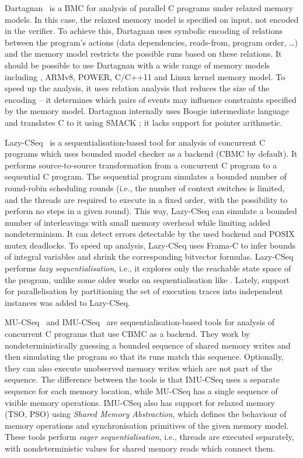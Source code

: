 Dartagnan~ is a BMC for analysis of parallel C programs under relaxed memory models.
In this case, the relaxed memory model is specified on input, not encoded in the verifier.
To achieve this, Dartagnan uses symbolic encoding of relations between the program's actions (data dependencies, reads-from, program order, …) and the memory model restricts the possible runs based on these relations.
It should be possible to use Dartagnan with a wide range of memory models including \xtso, ARMv8, POWER, C/C++11 and Linux kernel memory model.
To speed up the analysis, it uses relation analysis that reduces the size of the encoding -- it determines which pairs of events may influence constraints specified by the memory model.
Dartagnan internally uses Boogie intermediate language and translates C to it using SMACK ; it lacks support for pointer arithmetic.

Lazy-CSeq~ is a se\-quen\-tial\-isa\-tion-based
tool for analysis of concurrent C programs which uses bounded model checker as
a backend (CBMC by default).
It performs source-to-source transformation from a concurrent C program to a
sequential C program.
The sequential program simulates a bounded number of round-robin scheduling
rounds (i.e., the number of context switches is limited, and the threads are
required to execute in a fixed order, with the possibility to perform no steps
in a given round).
This way, Lazy-CSeq can simulate a bounded number of interleavings with small
memory overhead while limiting added nondeterminism.
It can detect errors detectable by the used backend and POSIX mutex deadlocks.
To speed up analysis, Lazy-CSeq uses Frama-C  to
infer bounds of integral variables and shrink the corresponding bitvector
formulas.
Lazy-CSeq performs \emph{lazy sequentialisation}, i.e., it explores only the reachable state space of the program, unlike some older works on sequentialisation like .
Lately, support for parallelisation by partitioning the set of execution traces into independent instances was added to Lazy-CSeq.

MU-CSeq~ and IMU-CSeq~
are se\-quen\-tial\-isa\-tion-based tools for analysis of concurrent C programs
that use CBMC as a backend.
They work by nondeterministically guessing a bounded sequence of shared memory
writes and then simulating the program so that its runs match this sequence.
Optionally, they can also execute unobserved memory writes which are not part of the
sequence.
The difference between the tools is that IMU-CSeq uses a separate sequence for
each memory location, while MU-CSeq has a single sequence of visible memory
operations.
IMU-CSeq also has support for relaxed memory (TSO, PSO) using \emph{Shared
Memory Abstraction}, which defines the behaviour of memory operations
and synchronisation primitives of the given memory model.
These tools perform \emph{eager sequentialisation}, i.e., threads are executed separately, with nondeterministic values for shared memory reads which connect them.

